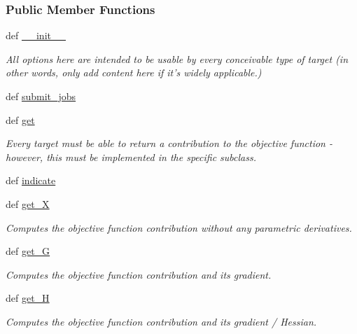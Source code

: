 \subsubsection*{\-Public \-Member \-Functions}
\begin{DoxyCompactItemize}
\item 
def \hyperlink{classforcebalance_1_1target_1_1RemoteTarget_ab73daaf7bc5b381fab27a795f950c73f}{\-\_\-\-\_\-init\-\_\-\-\_\-}
\begin{DoxyCompactList}\small\item\em \-All options here are intended to be usable by every conceivable type of target (in other words, only add content here if it's widely applicable.) \end{DoxyCompactList}\item 
def \hyperlink{classforcebalance_1_1target_1_1RemoteTarget_a59354bb1a7f474e82c65cb0ef2b55098}{submit\-\_\-jobs}
\item 
def \hyperlink{classforcebalance_1_1target_1_1RemoteTarget_a7a186f5b2e135448f9249154f7da8752}{get}
\begin{DoxyCompactList}\small\item\em \-Every target must be able to return a contribution to the objective function -\/ however, this must be implemented in the specific subclass. \end{DoxyCompactList}\item 
def \hyperlink{classforcebalance_1_1target_1_1RemoteTarget_abbdb5171b47a8f5380bf537c809b3b1f}{indicate}
\item 
def \hyperlink{classforcebalance_1_1target_1_1Target_a606dd136f195c267c05a2455405e5949}{get\-\_\-\-X}
\begin{DoxyCompactList}\small\item\em \-Computes the objective function contribution without any parametric derivatives. \end{DoxyCompactList}\item 
def \hyperlink{classforcebalance_1_1target_1_1Target_afa8cc38c8bba8861c072e789717aa049}{get\-\_\-\-G}
\begin{DoxyCompactList}\small\item\em \-Computes the objective function contribution and its gradient. \end{DoxyCompactList}\item 
def \hyperlink{classforcebalance_1_1target_1_1Target_a1d2ee27fe86a09769c1816af23b09adb}{get\-\_\-\-H}
\begin{DoxyCompactList}\small\item\em \-Computes the objective function contribution and its gradient / \-Hessian. \end{DoxyCompactList}\item 

\end{DoxyCompactItemize}
